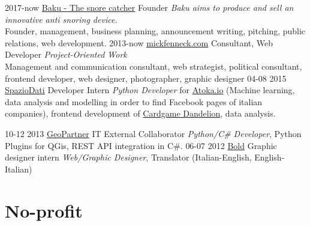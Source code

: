 \documentclass[]{friggeri-cv}
\begin{document}
\begin{entrylist}
\entry
    {2017-now}
    {\href{http://snorecatcher.it/it/benvenuti.html}{Baku - The snore catcher}}
    {Founder}
    {\emph{Baku aims to produce and sell an innovative anti snoring device.}\\
    {Founder, management, business planning, announcement writing, pitching, public relations, web development.}
    }
\entry
    {2013-now}
    {\href{http://www.mickfenneck.com}{mickfenneck.com}}
    {Consultant, Web Developer}
    {\emph{Project-Oriented Work}\\
    {Management and communication consultant, web strategist, political consultant, frontend developer, web designer, photographer, graphic designer}
    }
\entry
    {04-08 2015}
    {\href{https://spaziodati.eu/en/}{SpazioDati}}
    {Developer Intern}
    {\emph{Python Developer} for \href{https://atoka.io/en/}{Atoka.io} (Machine learning, data analysis and modelling in order to find Facebook pages of italian companies), frontend development of \href{http://cardgame.dandelion.eu}{Cardgame Dandelion}, data analysis.
    }
\end{entrylist}
\begin{entrylist}
\entry
    {10-12 2013}
    {\href{http://www.geopartner.it}{GeoPartner}}
    {IT External Collaborator}
    {\emph{Python/C\# Developer}, Python Plugins for QGis, REST API integration in C\#.
    }
\entry
    {06-07 2012}
    {\href{http://www.studiobold.it}{Bold}}
    {Graphic designer intern}
    {\emph{Web/Graphic Designer}, Translator (Italian-English, English-Italian)}
\end{entrylist}



\section{No-profit}
\end{document}
